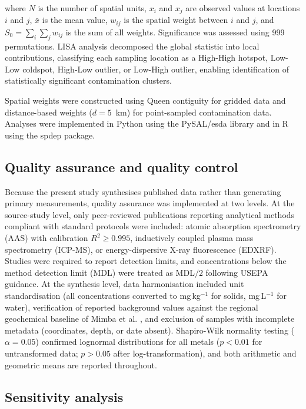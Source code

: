\documentclass[preprint,12pt,number]{elsarticle}
\begin{document}
\noindent where $N$ is the number of spatial units, $x_i$ and $x_j$ are observed values at locations $i$ and $j$, $\bar{x}$ is the mean value, $w_{ij}$ is the spatial weight between $i$ and $j$, and $S_0 = \sum_i \sum_j w_{ij}$ is the sum of all weights. Significance was assessed using 999 permutations. LISA analysis decomposed the global statistic into local contributions, classifying each sampling location as a High-High hotspot, Low-Low coldspot, High-Low outlier, or Low-High outlier, enabling identification of statistically significant contamination clusters.

Spatial weights were constructed using Queen contiguity for gridded data and distance-based weights ($d = 5$~km) for point-sampled contamination data. Analyses were implemented in Python using the PySAL/esda library and in R using the spdep package.


\subsection{Quality assurance and quality control}

Because the present study synthesises published data rather than generating primary measurements, quality assurance was implemented at two levels. At the source-study level, only peer-reviewed publications reporting analytical methods compliant with standard protocols were included: atomic absorption spectrometry (AAS) with calibration $R^{2} \geq 0.995$, inductively coupled plasma mass spectrometry (ICP-MS), or energy-dispersive X-ray fluorescence (EDXRF). Studies were required to report detection limits, and concentrations below the method detection limit (MDL) were treated as MDL$/2$ following USEPA guidance. At the synthesis level, data harmonisation included unit standardisation (all concentrations converted to mg\,kg$^{-1}$ for solids, mg\,L$^{-1}$ for water), verification of reported background values against the regional geochemical baseline of Mimba et al. \cite{Mimba2018}, and exclusion of samples with incomplete metadata (coordinates, depth, or date absent). Shapiro-Wilk normality testing ($\alpha = 0.05$) confirmed lognormal distributions for all metals ($p < 0.01$ for untransformed data; $p > 0.05$ after log-transformation), and both arithmetic and geometric means are reported throughout.


\subsection{Sensitivity analysis}
\end{document}
